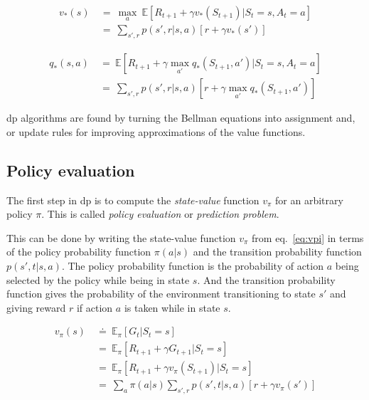 \begin{equation}
  \begin{aligned}
    v_*(s) \ &=\ \max_{a}\ \mathbb{E} \left [ R_{t+1} + \gamma v_*(S_{t+1}) | S_t=s, A_t=a \right ] \\    
             &=\ \sum_{s', r} p(s',r|s,a) \left [ r+\gamma v_*(s') \right ]
  \end{aligned}
    \label{eq:bellman_1}
\end{equation}

\begin{equation}
  \begin{aligned}
    q_*(s, a) \ &=\ \mathbb{E} \left [ R_{t+1} + \gamma \max_{a'} q_*(S_{t+1}, a') | S_t=s, A_t=a \right ] \\
        &=\ \sum_{s', r} p(s',r|s,a) \left [ r + \gamma \max_{a'} q_*(S_{t+1}, a') \right ]
  \end{aligned}
    \label{eq:bellman_2}
\end{equation}

\gls{dp} algorithms are found by turning the Bellman equations into assignment and, or update rules for improving approximations of the value functions.


\subsection{Policy evaluation}
The first step in \gls{dp} is to compute the \emph{state-value} function $v_\pi$ for an arbitrary policy $\pi$.
This is called \emph{policy evaluation} or \emph{prediction problem}.

This can be done by writing the state-value function $v_\pi$ from eq.~\ref{eq:vpi} in terms of the policy probability function $\pi(a|s)$ and the transition probability function $p(s', t | s, a)$.
The policy probability function is the probability of action $a$ being selected by the policy while being in state $s$.
And the transition probability function gives the probability of the environment transitioning to state $s'$ and giving reward $r$ if action $a$ is taken while in state $s$.

\begin{equation}
  \begin{aligned}
    v_\pi(s) \ &\doteq\ \mathbb{E}_\pi \left [ G_t | S_t = s\right ] \\
               &=\ \mathbb{E}_\pi \left [ R_{t+1}+\gamma G_{t+1} | S_t = s\right ] \\
               &=\ \mathbb{E}_\pi \left [ R_{t+1}+\gamma v_\pi(S_{t+1}) | S_t = s\right ] \\
               &=\ \sum_a \pi(a|s) \sum_{s',r} p(s', t | s, a) \left [ r + \gamma v_\pi(s') \right ]
    \label{eq:vpipe}
  \end{aligned}
\end{equation}

